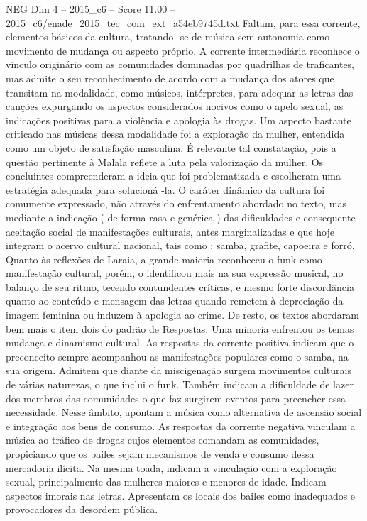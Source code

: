 \begin{textsample}{NEG Dim 4 – 2015\_c6 – Score 11.00 – 2015\_c6/enade\_2015\_tec\_com\_ext\_a54eb9745d.txt}
Faltam, para essa corrente, elementos básicos da cultura, tratando -se de música sem autonomia como movimento de mudança ou aspecto próprio.
A corrente intermediária reconhece o vínculo originário com as comunidades dominadas por quadrilhas de traficantes, mas admite o seu reconhecimento de acordo com a mudança dos atores que transitam na modalidade, como músicos, intérpretes, para adequar as letras das canções expurgando os aspectos considerados nocivos como o apelo sexual, as indicações positivas para a violência e apologia às drogas.
Um aspecto bastante criticado nas músicas dessa modalidade foi a exploração da mulher, entendida como um objeto de satisfação masculina.
É relevante tal constatação, pois a questão pertinente à Malala reflete a luta pela valorização da mulher.
Os concluintes compreenderam a ideia que foi problematizada e escolheram uma estratégia adequada para solucioná -la.
O caráter dinâmico da cultura foi comumente expressado, não através do enfrentamento abordado no texto, mas mediante a indicação ( de forma rasa e genérica ) das dificuldades e consequente aceitação social de manifestações culturais, antes marginalizadas e que hoje integram o acervo cultural nacional, tais como : samba, grafite, capoeira e forró.
Quanto às reflexões de Laraia, a grande maioria reconheceu o funk como manifestação cultural, porém, o identificou mais na sua expressão musical, no balanço de seu ritmo, tecendo contundentes críticas, e mesmo forte discordância quanto ao conteúdo e mensagem das letras quando remetem à depreciação da imagem feminina ou induzem à apologia ao crime.
De resto, os textos abordaram bem mais o item dois do padrão de Respostas.
Uma minoria enfrentou os temas mudança e dinamismo cultural.
As respostas da corrente positiva indicam que o preconceito sempre acompanhou as manifestações populares como o samba, na sua origem.
Admitem que diante da miscigenação surgem movimentos culturais de várias naturezas, o que inclui o funk.
Também indicam a dificuldade de lazer dos membros das comunidades o que faz surgirem eventos para preencher essa necessidade.
Nesse âmbito, apontam a música como alternativa de ascensão social e integração aos bens de consumo.
As respostas da corrente negativa vinculam a música ao tráfico de drogas cujos elementos comandam as comunidades, propiciando que os bailes sejam mecanismos de venda e consumo dessa mercadoria ilícita.
Na mesma toada, indicam a vinculação com a exploração sexual, principalmente das mulheres maiores e menores de idade.
Indicam aspectos imorais nas letras.
Apresentam os locais dos bailes como inadequados e provocadores da desordem pública.

\end{textsample}
